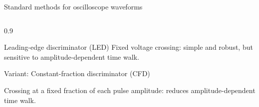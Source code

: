 \begin{frame}{Standard methods for oscilloscope waveforms}
\small
\vspace{-2mm}
\centering
{}

\begin{columns}
    \begin{column}{0.9\textwidth}

        \begin{block}{Leading-edge discriminator (LED)}
        Fixed voltage crossing: simple and robust, but sensitive to amplitude-dependent time walk.
        \end{block}

        \begin{block}{Variant: Constant-fraction discriminator (CFD)}

        \small

        Crossing at a fixed fraction of each pulse amplitude: reduces amplitude-dependent time walk.

        \end{block}
    \end{column}
\end{columns}



\end{frame}
